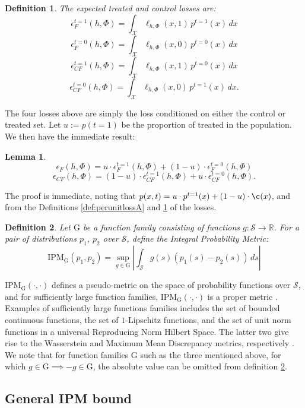\documentclass{article}
\newtheorem{thmappdef}{Definition}
\newtheorem{thmapplem}{Lemma}
\def\cX{\mathcal X}
\def\cS{\mathcal S}
\def\cF{\mathrm{G}}
\def \R{\mathbb{R}}
\newcommand{\pc}{p^{t=0}}
\newcommand{\pt}{p^{t=1}}
\newcommand{\lyxzeroh}{\ell_{h,\Phi}(x,0)}
\newcommand{\lyxoneh}{\ell_{h,\Phi}(x,1)}
\begin{document}
\begin{thmappdef}\label{def:decomploss}
The expected \emph{treated} and \emph{control} losses are:
$$\epsilon^{t=1}_F(h,\Phi) = \int_{\cX } \!\!\! \lyxoneh\, \pt(x)\, dx $$
$$\epsilon^{t=0}_F(h,\Phi) = \int_{\cX } \!\!\! \lyxzeroh\, \pc(x)\, dx $$
$$\epsilon^{t=1}_{CF}(h,\Phi) = \int_{\cX} \!\!\! \lyxoneh\, \pc(x)\, dx $$
$$\epsilon^{t=0}_{CF}(h,\Phi) = \int_{\cX } \!\!\! \lyxzeroh\, \pt(x)\, dx .$$
\end{thmappdef}
The four losses above are simply the loss conditioned on either the control or treated set.  Let $u := p(t=1)$ be the proportion of treated in the population. We then have the immediate result:
\begin{thmapplem}\label{lem:epsdecopm}
$$\epsilon_F(h,\Phi) = u\cdot \epsilon^{t=1}_F(h,\Phi) + (1-u)\cdot \epsilon^{t=0}_F(h,\Phi)$$
$$\epsilon_{CF}(h,\Phi) = (1-u)\cdot \epsilon^{t=1}_{CF}(h,\Phi) + u\cdot  \epsilon^{t=0}_{CF}(h,\Phi).$$
\end{thmapplem}
The proof is immediate, noting that $p(x,t) = u\cdot \pt(x) + (1-u)\cdot \c(x)$, and from the Definitions \ref{def:perunitlossA} and \ref{def:decomploss} of the losses.

\begin{thmappdef}\label{def:ipm}
Let $\cF$ be a function family consisting of functions $g: \cS\rightarrow \R$. For a pair of distributions $p_1$, $p_2$ over $\cS$, define the \emph{Integral Probability Metric}:
$$\text{IPM}_\cF(p_1,p_2) = \sup_{g\in \cF} \left|\int_\cS g(s) \left(p_1(s) - p_2(s)\right) \, ds \right|$$
\end{thmappdef}
$\text{IPM}_\cF(\cdot,\cdot)$ defines a pseudo-metric on the space of probability functions over $\cS$, and for sufficiently large function families, $\text{IPM}_\cF(\cdot,\cdot)$ is a proper metric \cite{muller1997integral}. Examples of sufficiently large functions families includes the set of bounded continuous functions, the set of $1$-Lipschitz functions, and the set of unit norm functions in a universal Reproducing Norm Hilbert Space. The latter two give rise to the Wasserstein and Maximum Mean Discrepancy metrics, respectively \cite{gretton2012mmd,sriperumbudur2012empirical}. We note that for function families $\cF$ such as the three mentioned above, for which $g \in \cF \implies -g \in \cF$, the absolute value can be omitted from definition \ref{def:ipm}.


\subsection{General IPM bound}
\end{document}
